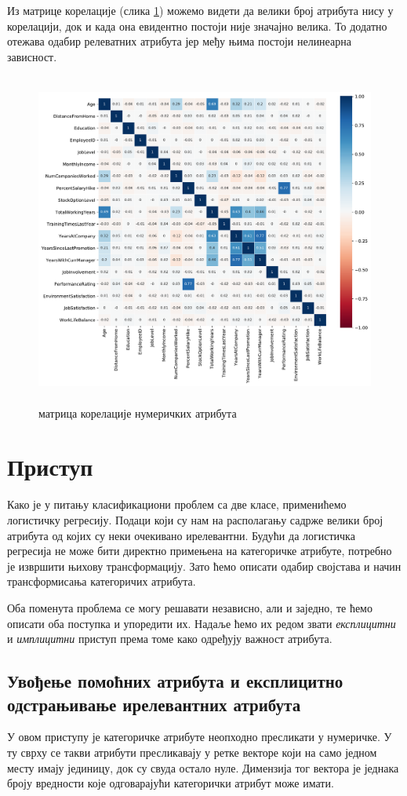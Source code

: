 \documentclass[12pt, a4paper]{article}
\begin{document}
	Из матрице корелације (слика \ref{fig:corr}) можемо видети да велики број атрибута нису у корелацији, док и када она евидентно постоји није значајно велика. То додатно отежава одабир релеватних атрибута јер међу њима постоји нелинеарна зависност.
	
	\begin{figure}[H]
		\centering
		\includegraphics[height=11cm]{graphics/correlation.pdf}
		\caption{матрица корелације нумеричких атрибута}
		\label{fig:corr}
	\end{figure}

\section{Приступ}
	Како је у питању класификациони проблем са две класе, применићемо логистичку регресију. Подаци који су нам на располагању садрже велики број атрибута од којих су неки очекивано ирелевантни. Будући да логистичка регресија не може бити директно примењена на категоричке атрибуте, потребно је извршити њихову трансформацију. Зато ћемо описати одабир својстава и начин трансформисања категоричих атрибута.
	
	Оба поменута проблема се могу решавати независно, али и заједно, те ћемо описати оба поступка и упоредити их. Надаље ћемо их редом звати \textit{експлицитни} и \textit{имплицитни} приступ према томе како одређују важност атрибута.
	
	\subsection{Увођење помоћних атрибута и експлицитно одстрањивање ирелевантних атрибута}
		У овом приступу је категоричке атрибуте неопходно пресликати у нумеричке. У ту сврху се такви атрибути пресликавају у ретке векторе који на само једном месту имају јединицу, док су свуда остало нуле. Димензија тог вектора је једнака броју вредности које одговарајући категорички атрибут може имати.
	
\end{document}
